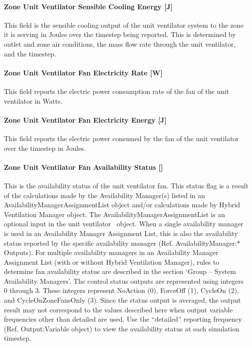 \paragraph{Zone Unit Ventilator Sensible Cooling Energy {[}J{]}}\label{zone-unit-ventilator-sensible-cooling-energy-j}

This field is the sensible cooling output of the unit ventilator system to the zone it is serving in Joules over the timestep being reported. This is determined by outlet and zone air conditions, the mass flow rate through the unit ventilator, and the timestep.

\paragraph{Zone Unit Ventilator Fan Electricity Rate {[}W{]}}\label{zone-unit-ventilator-fan-electric-power-w}

This field reports the electric power consumption rate of the fan of the unit ventilator in Watts.

\paragraph{Zone Unit Ventilator Fan Electricity Energy {[}J{]}}\label{zone-unit-ventilator-fan-electric-energy-j}

This field reports the electric power consumed by the fan of the unit ventilator over the timestep in Joules.

\paragraph{Zone Unit Ventilator Fan Availability Status {[]}}\label{zone-unit-ventilator-fan-availability-status}

This is the availability status of the unit ventilator fan. This status flag is a result of the calculations made by the Availability Manager(s) listed in an AvailabilityManagerAssignmentList object and/or calculations made by Hybrid Ventilation Manager object. The AvailabilityManagerAssignmentList is an optional input in the unit ventilator~ object. When a single availability manager is used in an Availability Manager Assignment List, this is also the availability status reported by the specific availability manager (Ref. AvailabilityManager:* Outputs). For multiple availability managers in an Availability Manager Assignment List (with or without Hybrid Ventilation Manager), rules to determine fan availability status are described in the section `Group -- System Availability Managers'. The control status outputs are represented using integers 0 through 3. These integers represent NoAction (0), ForceOff (1), CycleOn (2), and CycleOnZoneFansOnly (3). Since the status output is averaged, the output result may not correspond to the values described here when output variable frequencies other than detailed are used. Use the ``detailed'' reporting frequency (Ref. Output:Variable object) to view the availability status at each simulation timestep.

